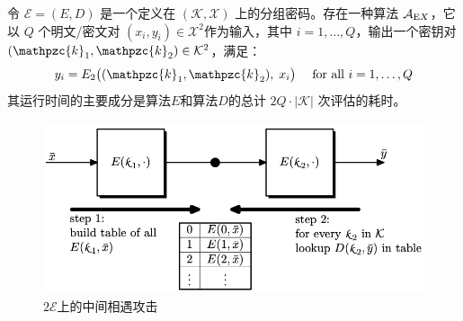 \begin{theorem}\label{theo:4-2}
令 $\mathcal{E}=(E,D)$ 是一个定义在 $(\mathcal{K},\mathcal{X})$ 上的分组密码。存在一种算法 $\mathcal{A}_{{\rm E}X}$，它以 $Q$ 个明文/密文对 $(x_i,y_i)\in\mathcal{X}^2$作为输入，其中 $i=1,\dots,Q$，输出一个密钥对 $(\mathpzc{k}_1,\mathpzc{k}_2)\in\mathcal{K}^2$，满足：
\begin{equation}\label{eq:4-9}
y_i=E_2\big((\mathpzc{k}_1,\mathpzc{k}_2),\;x_i\big)
\quad\text{ for all }
i=1,\dots,Q
\end{equation}
其运行时间的主要成分是算法$E$和算法$D$的总计 $2Q\cdot|\mathcal{K}|$ 次评估的耗时。
\end{theorem}

\begin{figure}
  \centering
  \includegraphics[width=0.6\linewidth]{figures/chapter4/fig10.png}
  \caption{$2\mathcal{E}$上的中间相遇攻击}
  \label{fig:4-10}
\end{figure}

